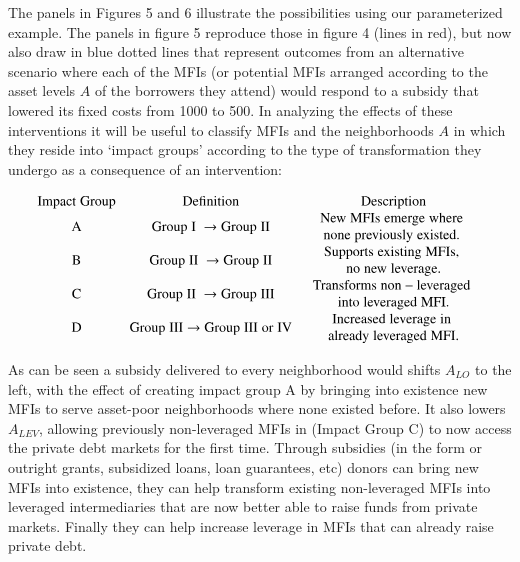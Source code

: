 \documentclass{article} %
\begin{document}
The panels in Figures 5 and 6 illustrate the possibilities using our parameterized example.  The panels in figure 5 reproduce those in figure 4 (lines in red), but now also draw in blue dotted lines that represent outcomes from an alternative scenario where each of the MFIs (or potential MFIs arranged according to the asset levels $A$ of the borrowers they attend) would respond to a subsidy that lowered its fixed costs from 1000 to 500.  In analyzing the effects of these interventions it will be useful to classify MFIs and the neighborhoods $A$ in which they reside into `impact groups' according to the type of transformation they undergo as a consequence of an intervention: 


\[\begin{array}{ccc} {{\rm Impact}\; {\rm Group}} & {{\rm Definition}} & {{\rm Description}} \\ {{\rm A}} & {{\rm Group}\; {\rm I}\; \to {\rm Group}\; {\rm II}} & {\begin{array}{c} {{\rm New}\; {\rm MFIs}\; {\rm emerge}\; {\rm where}\; } \\ {{\rm none}\; {\rm previously}\; {\rm existed}.\; } \end{array}} \\ {{\rm B}} & {{\rm Group}\; {\rm II}\; \to {\rm Group}\; {\rm II}} & {\begin{array}{c} {{\rm Supports}\; {\rm existing}\; {\rm MFIs},\; } \\ {{\rm no}\; {\rm new}\; {\rm leverage}.} \end{array}} \\ {{\rm C}} & {{\rm Group}\; {\rm II}\; \to {\rm Group}\; {\rm III}} & {\begin{array}{c} {{\rm Transforms}\; {\rm non}-{\rm leveraged}\; } \\ {{\rm into}\; {\rm leveraged}\; {\rm MFI}.} \end{array}} \\ {{\rm D}} & {{\rm Group}\; {\rm III}\to {\rm Group}\; {\rm III}\; {\rm or}\; {\rm IV}} & {\begin{array}{c} {{\rm Increased}\; {\rm leverage}\; {\rm in}\; } \\ {{\rm already}\; {\rm leveraged}\; {\rm MFI}.} \end{array}} \end{array}\] 

As can be seen a subsidy delivered to every neighborhood would shifts $A_{LO} $ to the left, with the effect of creating impact group A by bringing into existence new MFIs to serve asset-poor neighborhoods where none existed before.  It also lowers $A_{LEV} $, allowing previously non-leveraged MFIs in (Impact Group C) to now access the private debt markets for the first time.  Through subsidies (in the form or outright grants, subsidized loans, loan guarantees, etc) donors can bring new MFIs into existence, they can help transform existing non-leveraged MFIs into leveraged intermediaries that are now better able to raise funds from private markets.  Finally they can help increase leverage in MFIs that can already raise private debt. 
\end{document}
